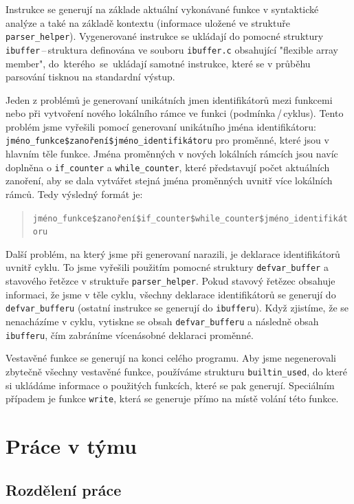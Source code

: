 \documentclass[11pt]{article}
\begin{document}
Instrukce se generují na základe aktuální vykonávané funkce v syntaktické analýze a také na základě kontextu (informace uložené ve struktuře
\texttt{parser\_helper}). Vygenerované instrukce se ukládají do pomocné struktury \texttt{ibuffer}\,--\,struktura definována ve souboru \texttt{ibuffer.c}
obsahující "flexible array member", do~kterého~se~ukládají samotné instrukce, které se v průběhu parsování tisknou na standardní výstup.

Jeden z problémů je generovaní unikátních jmen identifikátorů mezi funkcemi nebo při vytvoření nového lokálního rámce ve funkci (podmínka\,/\,cyklus).
Tento problém jsme vyřešili pomocí generovaní unikátního jména identifikátoru: \texttt{jméno\_funkce\$zanoření\$jméno\_identifikátoru} pro proměnné,
které jsou v hlavním těle funkce. Jména proměnných v nových lokálních rámcích jsou navíc doplněna o \texttt{if\_counter} a \texttt{while\_counter},
které představují počet aktuálních zanoření, aby se dala vytvářet stejná jména proměnných uvnitř více lokálních rámců. Tedy výsledný formát je:

\begin{quotation}
    \texttt{jméno\_funkce\$zanoření\$if\_counter\$while\_counter\$jméno\_identifikátoru}
\end{quotation}

Další problém, na který jsme při generovaní narazili, je deklarace identifikátorů uvnitř cyklu. To jsme vyřešili použitím pomocné struktury
\texttt{defvar\_buffer} a stavového řetězce v struktuře \texttt{parser\_helper}. Pokud stavový řetězec obsahuje informaci, že jsme v těle cyklu,
všechny deklarace identifikátorů se generují do \texttt{defvar\_bufferu} (ostatní instrukce se generují do \texttt{ibufferu}). Když zjistíme,
že se nenacházíme v cyklu, vytiskne se obsah \texttt{defvar\_bufferu} a následně obsah \texttt{ibufferu}, čím zabráníme vícenásobné deklaraci proměnné.

Vestavěné funkce se generují na konci celého programu. Aby jsme negenerovali zbytečně všechny vestavěné funkce, používáme strukturu \texttt{builtin\_used},
do které si ukládáme informace o použitých funkcích, které se pak generují. Speciálním případem je funkce \texttt{write}, která se generuje přímo na místě volání této funkce.

\section{Práce v týmu}

\subsection{Rozdělení práce}
\end{document}
